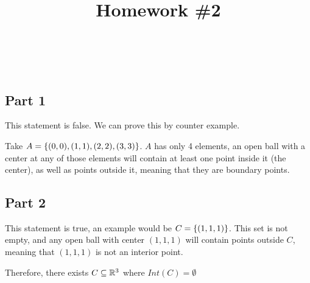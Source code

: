 \documentclass[12pt]{article} %
\title{
    \vspace{2in}
        \textmd{\textbf{\classTitle}}\\
    \vspace{1in}
    \textmd{\textbf{Homework \#2}}\\
    \vspace{1in}
}
\author{
    \hmwkAuthorName\\
    \hmwkStudentnum\\
}
\date{}
\begin{document}
\maketitle

\pagebreak

\begin{homeworkProblem}

    \subsection*{Part 1}

    This statement is false. We can prove this by counter example.

    Take $A = \left\{(0, 0), (1, 1), (2, 2), (3, 3)\right\}$. $A$ has only 4 elements, an open ball with a center at any of those elements
    will contain at least one point inside it (the center), as well as points outside it, meaning that they are boundary points.

    \subsection*{Part 2}

    This statement is true, an example would be $C = \left\{(1, 1, 1)\right\}$. This set is not empty, and any open ball with center $(1, 1, 1)$ will contain points outside $C$, meaning that $(1, 1, 1)$ is not an interior point.

    Therefore, there exists $C \subseteq \mathbb{R}^3$ where $Int(C) = \emptyset$

\end{homeworkProblem}
\pagebreak
\end{document}
